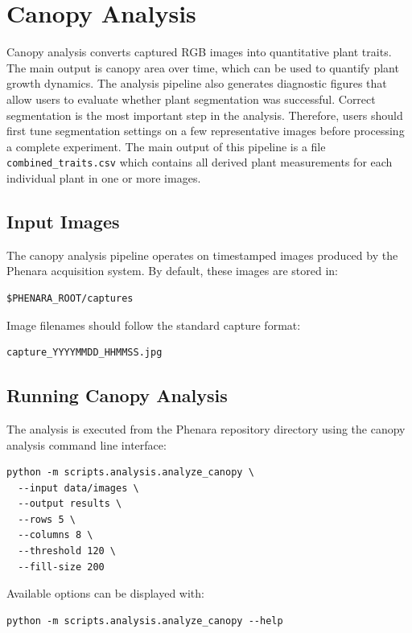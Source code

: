 \section{Canopy Analysis}

Canopy analysis converts captured RGB images into quantitative plant traits.
The main output is canopy area over time, which can be used to quantify plant
growth dynamics. The analysis pipeline also generates diagnostic figures that
allow users to evaluate whether plant segmentation was successful. Correct
segmentation is the most important step in the analysis. Therefore, users
should first tune segmentation settings on a few representative images before
processing a complete experiment. The main output of this pipeline is a file
\texttt{combined\_traits.csv} which contains all derived plant measurements for
each individual plant in one or more images.

\subsection{Input Images}

The canopy analysis pipeline operates on timestamped images produced by the
Phenara acquisition system. By default, these images are stored in:

\begin{verbatim}
$PHENARA_ROOT/captures
\end{verbatim}

Image filenames should follow the standard capture format:

\begin{verbatim}
capture_YYYYMMDD_HHMMSS.jpg
\end{verbatim}

\subsection{Running Canopy Analysis}

The analysis is executed from the Phenara repository directory using the canopy
analysis command line interface:

\begin{verbatim}
python -m scripts.analysis.analyze_canopy \
  --input data/images \
  --output results \
  --rows 5 \
  --columns 8 \
  --threshold 120 \
  --fill-size 200
\end{verbatim}

Available options can be displayed with:

\begin{verbatim}
python -m scripts.analysis.analyze_canopy --help
\end{verbatim}

